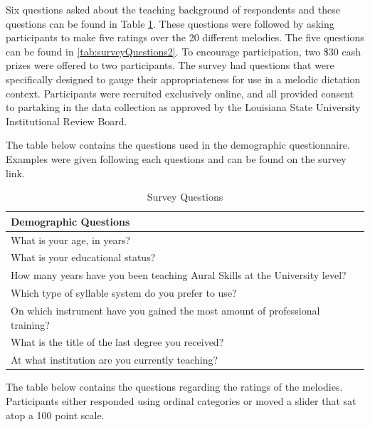 \documentclass[english,man,floatsintext]{apa6}
\begin{document}
Six questions asked about the teaching background of respondents and these questions can be found in Table \ref{tab:surveyQuestions1}.
These questions were followed by asking participants to make five ratings over the 20 different melodies.
The five questions can be found in \ref{tab:surveyQuestions2}.
To encourage participation, two \$30 cash prizes were offered to two participants.
The survey had questions that were specifically designed to gauge their appropriateness for use in a melodic dictation context.
Participants were recruited exclusively online, and all provided consent to partaking in the data collection as approved by the Louisiana State University Institutional Review Board.

The table below contains the questions used in the demographic questionnaire.
Examples were given following each questions and can be found on the survey link.

\begin{longtable}[t]{l}
\caption{\label{tab:surveyQuestions1}Survey Questions}\\
\toprule
Demographic Questions\\
\midrule
What is your age, in years?\\
What is your educational status?\\
How many years have you been teaching Aural Skills at the University level?\\
Which type of syllable system do you prefer to use?\\
On which instrument have you gained the most amount of professional training?\\
What is the title of the last degree you received?\\
At what institution are you currently teaching?\\
\bottomrule
\end{longtable}

The table below contains the questions regarding the ratings of the melodies.
Participants either responded using ordinal categories or moved a slider that sat atop a 100 point scale.
\end{document}
